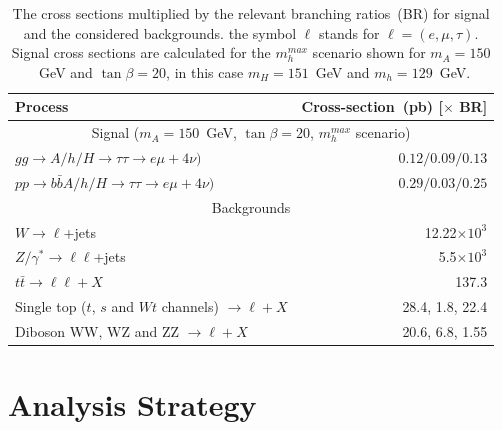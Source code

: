 \begin{table}[tp]
\begin{center}
\begin{small}
\begin{tabular}{lr}
\hline \hline
Process                                                                 & Cross-section~(pb) [$\times$ BR] \\ [1pt]
\hline
\multicolumn{2}{c}{Signal ($m_A=150$~GeV, $\tan\beta=20$, $m_{h}^{max}$ scenario) }  \\ [1pt]

$gg\rightarrow A/h/H \rightarrow\tau\tau \rightarrow e\mu+ 4\nu)$                 &  $0.12 / 0.09 / 0.13$ \\
$pp \rightarrow b\bar{b}A/h/H \rightarrow \tau\tau \rightarrow e\mu + 4\nu)$       & $ 0.29 /0.03 / 0.25   $ \\[1pt]
\hline
\multicolumn{2}{c}{Backgrounds} \\[1pt]
$W\rightarrow \ell$+jets                           & 12.22$\times 10^3$ \\
$Z/\gamma^{*}\rightarrow \ell\ell$+jets       & 5.5$\times 10^3$ \\
$t\bar{t} \rightarrow \ell \ell + X$                                                              & 137.3 \\
Single top ($t$, $s$ and $Wt$ channels) $\rightarrow \ell + X$               & 28.4, 1.8, 22.4 \\
Diboson WW, WZ and ZZ  $\rightarrow \ell + X$                                          & 20.6, 6.8, 1.55 \\ [1pt]
\hline 
\hline
\end{tabular}
\end{small}
\caption{The cross sections multiplied by the relevant branching ratios~(BR) for signal and the considered
backgrounds. the symbol $\ell$ stands for $\ell= (e, \mu, \tau)$. 
Signal cross sections are calculated for the $m_{h}^{max}$ scenario shown for
 $m_A=150$~GeV and $\tan\beta=20$, in this case  $m_H=151$~GeV and $m_h=129$~GeV.}
 \label{tab:MCxsec}

\end{center}
\end{table}


\section{Analysis Strategy} \label{sec:strategy}

